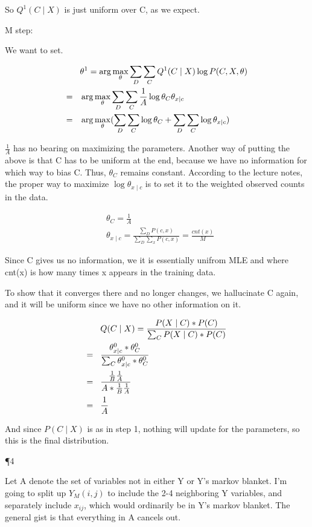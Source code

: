 So $Q^1(C \mid X)$ is just uniform over C, as we expect.

M step:

We want to set. 

\begin{align*}
& \theta^1 = \arg\max_{\theta} \sum_D \sum_C Q^1(C \mid X) \log P(C, X, \theta) \\ = \hspace{3 mm} &
\arg\max_{\theta} \sum_D \sum_C \frac{1}{A} \log \theta_C \theta_{x\mid c} \\ = \hspace{3 mm} &
\arg\max_{\theta}( \sum_D \sum_C \log \theta_C + \sum_D \sum_C \log\theta_{x\mid c} )
\end{align*}

$\frac{1}{A}$ has no bearing on maximizing the parameters. Another way of putting the above is that C has to be uniform at the end, because we have no information for which way to bias C. Thus, $\theta_C$ remains constant. According to the lecture notes, the proper way to maximize $\log\theta_{x\mid c}$ is to set it to the weighted observed counts in the data.

\begin{align*}
& \theta_C = \frac{1}{A} \\
& \theta_{x\mid c} = \frac{\sum_D P(c,x)}{\sum_D \sum_x P(c,x)} = \frac{cnt(x)}{M}
\end{align*}

Since C gives us no information, we it is essentially unifrom MLE and where cnt(x) is how many times x appears in the training data.

To show that it converges there and no longer changes, we hallucinate C again, and it will be uniform since we have no other information on it.

\begin{align*}
& Q(C \mid X) = \frac{P(X \mid C) * P(C)}{\sum_C P(X \mid C) * P(C)} \\ = \hspace{3 mm} &
\frac{\theta_{x\mid c}^0 * \theta_C^0}{\sum_C \theta_{x\mid c}^0 * \theta_C^0} \\ = \hspace{3 mm} &
\frac{\frac{1}{B}\frac{1}{A}}{A*\frac{1}{B}\frac{1}{A}} \\ = \hspace{3 mm} &
\frac{1}{A}
\end{align*}

And since $P(C \mid X)$ is as in step 1, nothing will update for the parameters, so this is the final distribution.

\P 4

Let A denote the set of variables not in either Y or Y's markov blanket. I'm going to split up $Y_M(i,j)$ to include the 2-4 neighboring Y variables, and separately include $x_{ij}$, which would ordinarily be in Y's markov blanket. The general gist is that everything in A cancels out.

